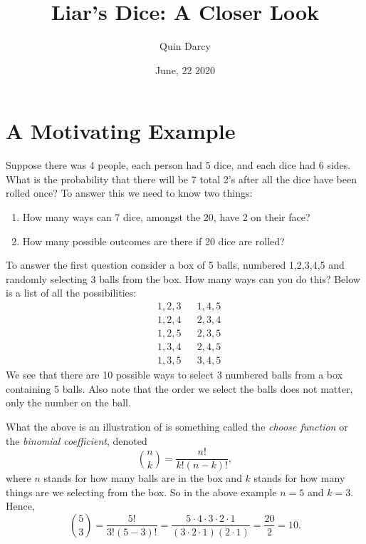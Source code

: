 \documentclass[leqno]{article}
\theoremstyle{definition}
\theoremstyle{remark}
\theoremstyle{definition}
\begin{document}
\title{Liar's Dice: A Closer Look}
\author{Quin Darcy}
\date{June, 22 2020}
\maketitle

\section{A Motivating Example}

Suppose there was 4 people, each person had 5 dice, and each dice had 6 sides. What is the probability that there will be 7 total 2's after all the dice have been rolled once? To answer this we need to know two things:
    \begin{enumerate}[label=(\roman*)]
        \item How many ways can 7 dice, amongst the 20, have 2 on their face?
        \item How many possible outcomes are there if 20 dice are rolled?
    \end{enumerate}
To answer the first question consider a box of 5 balls, numbered 1,2,3,4,5 and  randomly selecting 3 balls from the box. How many ways can you do this? Below is a list of all the possibilities:
    \begin{align*}
         &1,2,3 & &1,4,5 \\
         &1,2,4 & &2,3,4 \\
         &1,2,5 & &2,3,5 \\
         &1,3,4 & &2,4,5 \\
         &1,3,5 & &3,4,5
    \end{align*}
We see that there are 10 possible ways to select 3 numbered balls from a box containing 5 balls. Also note that the order we select the balls does not matter, only the number on the ball.\par What the above is an illustration of is something called the \emph{choose function} or the \emph{binomial coefficient}, denoted
    \begin{equation*}
        \binom{n}{k}=\frac{n!}{k!(n-k)!},
    \end{equation*}
where $n$ stands for how many balls are in the box and $k$ stands for how many things are we selecting from the box. So in the above example $n=5$ and $k=3$. Hence,
    \begin{equation*}
        \binom{5}{3}=\frac{5!}{3!(5-3)!}=\frac{5\cdot4\cdot3\cdot2\cdot1}{(3\cdot2\cdot1)(2\cdot1)}=\frac{20}{2}=10.
    \end{equation*}
\end{document}
